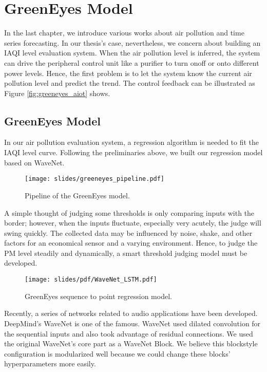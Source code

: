 \chapter{GreenEyes Model}\label{chap:greeneyes_model}

In the last chapter, we introduce various works about air pollution and time series forecasting. In our thesis's case, nevertheless, we concern about building an IAQI level evaluation system. When the air pollution level is inferred, the system can drive the peripheral control unit like a purifier to turn on\/off or onto different power levels. Hence, the first problem is to let the system know the current air pollution level and predict the trend. The control feedback can be illustrated as Figure \ref{fig:greeneyes_aiot} shows.

\section{GreenEyes Model}

In our air pollution evaluation system, a regression algorithm is needed to fit the IAQI level curve. Following the preliminaries above, we built our regression model based on WaveNet.

\begin{figure}[!htbp]
    \centering
    \texttt{[image: slides/greeneyes\_pipeline.pdf]}
    \caption{Pipeline of the GreenEyes model.}
    \label{fig:greeneyes_pipeline}
\end{figure}

A simple thought of judging some thresholds is only comparing inputs with the border; however, when the inputs fluctuate, especially very acutely, the judge will swing quickly. The collected data may be influenced by noise, shake, and other factors for an economical sensor and a varying environment. Hence, to judge the PM level steadily and dynamically, a smart threshold judging model must be developed. 

\begin{figure}[!htbp]
    \centering
    \texttt{[image: slides/pdf/WaveNet\_LSTM.pdf]}
    \caption{GreenEyes sequence to point regression model.}
    \label{fig:greeneyes_model}
\end{figure}

Recently, a series of networks related to audio applications have been developed. DeepMind's WaveNet \cite{oord2016wavenet} is one of the famous. WaveNet used dilated convolution for the sequential inputs and also took advantage of residual connections. We used the original WaveNet's core part as a WaveNet Block. We believe this block\-style configuration is modularized well because we could change these blocks' hyperparameters more easily.

